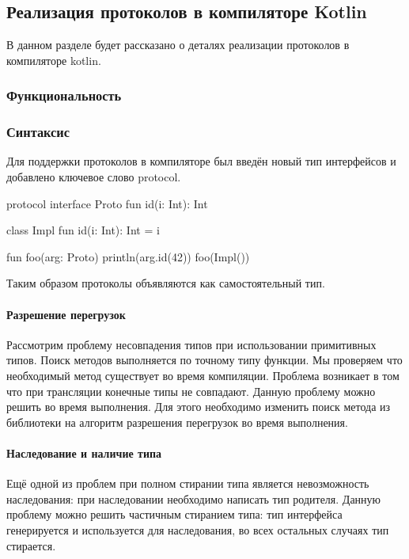 \subsection{Реализация протоколов в компиляторе Kotlin}
В данном разделе будет рассказано о деталях реализации протоколов в компиляторе kotlin.

\subsubsection{Функциональность}
\subsubsection{Синтаксис}
Для поддержки протоколов в компиляторе был введён новый тип интерфейсов и добавлено ключевое слово protocol.

\begin{pyglist}[language=kotlin]
protocol interface Proto {
    fun id(i: Int): Int
}

class Impl {
    fun id(i: Int): Int = i
}

fun foo(arg: Proto) {
    println(arg.id(42))
}
foo(Impl())
\end{pyglist}

Таким образом протоколы объявляются как самостоятельный тип.

\paragraph{Разрешение перегрузок}
Рассмотрим проблему несовпадения типов при использовании примитивных типов. Поиск методов выполняется по точному типу функции. Мы проверяем что необходимый метод существует во время компиляции. Проблема возникает в том что при трансляции конечные типы не совпадают. Данную проблему можно решить во время выполнения. Для этого необходимо изменить поиск метода из библиотеки на алгоритм разрешения перегрузок во время выполнения.

\paragraph{Наследование и наличие типа}
Ещё одной из проблем при полном стирании типа является невозможность наследования: при наследовании необходимо написать тип родителя. Данную проблему можно решить частичным стиранием типа: тип интерфейса генерируется и используется для наследования, во всех остальных случаях тип стирается.

